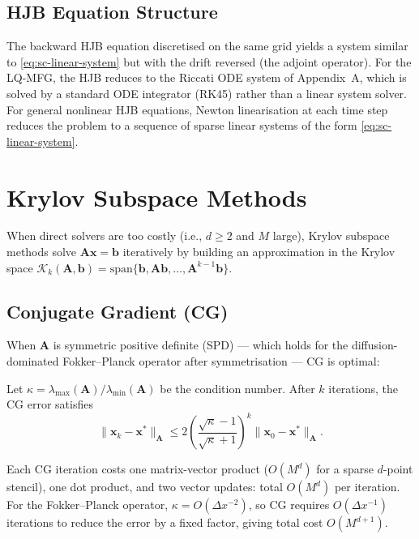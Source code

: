 \subsection{HJB Equation Structure}

The backward HJB equation discretised on the same grid yields a system similar
to \eqref{eq:sc-linear-system} but with the drift reversed (the adjoint operator).
For the LQ-MFG, the HJB reduces to the Riccati ODE system of Appendix~A, which
is solved by a standard ODE integrator (RK45) rather than a linear system solver.
For general nonlinear HJB equations, Newton linearisation at each time step reduces
the problem to a sequence of sparse linear systems of the form
\eqref{eq:sc-linear-system}.

\section{Krylov Subspace Methods}
\label{sec:sc-krylov}

When direct solvers are too costly (i.e., $d \ge 2$ and $M$ large), Krylov
subspace methods solve $\mathbf{A}\mathbf{x} = \mathbf{b}$ iteratively by
building an approximation in the Krylov space
$\mathcal{K}_k(\mathbf{A}, \mathbf{b}) = \mathrm{span}\{\mathbf{b}, \mathbf{Ab},
\ldots, \mathbf{A}^{k-1}\mathbf{b}\}$.

\subsection{Conjugate Gradient (CG)}

When $\mathbf{A}$ is symmetric positive definite (SPD) --- which holds for the
diffusion-dominated Fokker--Planck operator after symmetrisation --- CG is optimal:

\begin{theorem}[CG convergence]
Let $\kappa = \lambda_{\max}(\mathbf{A}) / \lambda_{\min}(\mathbf{A})$ be the
condition number. After $k$ iterations, the CG error satisfies
\[
    \|\mathbf{x}_k - \mathbf{x}^*\|_{\mathbf{A}} \le 2\left(
    \frac{\sqrt{\kappa}-1}{\sqrt{\kappa}+1}\right)^k \|\mathbf{x}_0 -
    \mathbf{x}^*\|_{\mathbf{A}}.
\]
\end{theorem}

Each CG iteration costs one matrix-vector product ($O(M^d)$ for a sparse $d$-point
stencil), one dot product, and two vector updates: total $O(M^d)$ per iteration.
For the Fokker--Planck operator, $\kappa = O(\Delta x^{-2})$, so CG requires
$O(\Delta x^{-1})$ iterations to reduce the error by a fixed factor, giving total
cost $O(M^{d+1})$.

